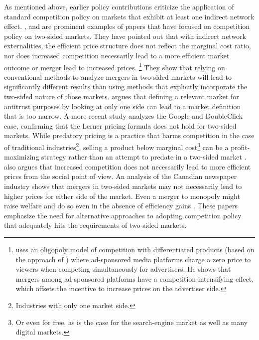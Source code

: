 \documentclass[12pt,a4paper,notitlepage]{article}
\begin{document}
As mentioned above, earlier policy contributions criticize the application of standard competition policy on markets that exhibit at least one indirect network effect. \citet{evans_antitrust_2003}, \citet{evans_industrial_2007} \citet{wright_one-sided_2004} and \citet{kaiser_price_2006} are prominent examples of papers that have focused on competition policy on two-sided markets. They have pointed out that with indirect network externalities, the efficient price structure does not reflect the marginal cost ratio, nor does increased competition necessarily lead to a more efficient market outcome or merger lead to increased prices. \footnote{\citet{malam_mergers_2011} uses an oligopoly model of competition with differentiated products (based on the approach of \citet{salop_monopolistic_1979}) where ad-sponsored media platforms charge a zero price to viewers when competing simultaneously for advertisers. He shows that mergers among ad-sponsored platforms have a competition-intensifying effect, which offsets the incentive to increase prices on the advertiser side.} They show that relying on conventional methods to analyze mergers in two-sided markets will lead to significantly different results than using methods that explicitly incorporate the two-sided nature of those markets. \citet{evans_antitrust_2003} argues that defining a relevant market for antitrust purposes by looking at only one side can lead to a market definition that is too narrow. A more recent study \citet{evans_analysis_2008} analyzes the Google and DoubleClick case, confirming that the Lerner pricing formula does not hold for two-sided markets. While predatory pricing is a practice that harms competition in the case of traditional industries\footnote{Industries with only one market side.}, selling a product below marginal cost\footnote{Or even for free, as is the case for the search-engine market as well as many digital markets.} can be a profit-maximizing strategy rather than an attempt to predate in a two-sided market \citep{wright_one-sided_2004}. \citet{wright_one-sided_2004} also argues that increased competition does not necessarily lead to more efficient prices from the social point of view. An analysis of the Canadian newspaper industry shows that mergers in two-sided markets may not necessarily lead to higher prices for either side of the market. Even a merger to monopoly might raise welfare and do so even in the absence of efficiency gains \citep{leonello_horizontal_2010}. These papers emphasize the need for alternative approaches to adopting competition policy that adequately hits the requirements of two-sided markets. 
\end{document}
